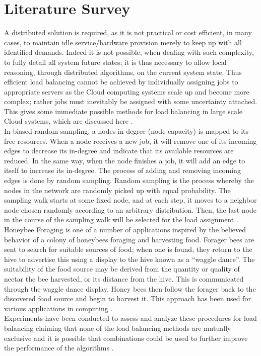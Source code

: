 \vspace{-1in}
\chapter{Literature Survey}
A distributed solution is required, as it is not practical or cost efficient, in many cases, to maintain idle service/hardware provision merely to keep up with all identified demands. Indeed it is not possible, when dealing with such complexity, to fully detail all system future states; it is thus necessary to allow local reasoning, through distributed algorithms, on the current system state. Thus efficient load balancing cannot be achieved by individually assigning jobs to appropriate servers as the Cloud computing systems scale up and become more complex; rather jobs must inevitably be assigned with some uncertainty attached. This gives some immediate possible methods for load balancing in large scale Cloud systems, which are discussed here \cite {Ratan}. \\[0.2cm]
In biased random sampling, a nodes in-degree (node capacity) is mapped to its free resources. When a node receives a new job, it will remove one of its incoming edges to decrease its in-degree and indicate that its available resources are reduced. In the same way, when the node finishes a job, it will add an edge to itself to increase its in-degree. The process of adding and removing incoming edges is done by random sampling. Random sampling is the process whereby the nodes in the network are randomly picked up with equal probability. The sampling walk starts at some fixed node, and at each step, it moves to a neighbor node chosen randomly according to an arbitrary distribution. Then, the last node in the course of the sampling walk will be selected for the load assignment \cite {Randles1}.\\[0.2cm]
Honeybee Foraging is one of a number of applications inspired by the believed behavior of a colony of honeybees foraging and harvesting food. Forager bees are sent to search for suitable sources of food; when one is found, they return to the hive to advertise this using a display to the hive known as a “waggle dance”. The suitability of the food source may be derived from the quantity or quality of nectar the bee harvested, or its distance from the hive. This is communicated through the waggle dance display. Honey bees then follow the forager back to the discovered food source and begin to harvest it. This approach has been used for various applications in computing \cite {Randles1}.\\[0.2cm]
Experiments have been conducted to assess and analyze these procedures for load balancing claiming that none of the load balancing methods are mutually exclusive and it is possible that combinations could be used to further improve the performance of the algorithms \cite {Randles2}.

